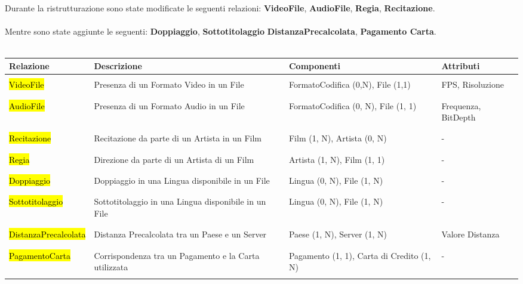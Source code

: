 \documentclass{article}
\begin{document}
\\ 
\\
Durante la ristrutturazione sono state modificate le seguenti relazioni: \textbf{VideoFile}, \textbf{AudioFile}, \textbf{Regia}, \textbf{Recitazione}.
\\ \\ 
Mentre sono state aggiunte le seguenti: \textbf{Doppiaggio}, \textbf{Sottotitolaggio} \textbf{DistanzaPrecalcolata}, \textbf{Pagamento Carta}.
\\ \\
\begin{tabular}{|C{2cm}|C{4.5cm}|C{2.5cm}|C{1.9cm}|}
\hline
 \textbf{Relazione}& \textbf{Descrizione}& \textbf{Componenti}& \textbf{Attributi}\\ 
\hline
\hline
& & & \\
 \hl{VideoFile} & Presenza di un Formato Video in un File & FormatoCodifica (0,N), File (1,1) & FPS, Risoluzione \\ 
& & & \\
\hline
& & & \\
 \hl{AudioFile} & Presenza di un Formato Audio in un File & FormatoCodifica (0, N), File (1, 1) & Frequenza, BitDepth \\ 
& & & \\
\hline
& & & \\
 \hl{Recitazione} & Recitazione da parte di un Artista in un Film & Film (1, N), Artista (0, N) & - \\ 
& & & \\
\hline
& & & \\
 \hl{Regia} & Direzione da parte di un Artista di un Film & Artista (1, N), Film (1, 1) & - \\
& & & \\
\hline
& & & \\
 \hl{Doppiaggio} & Doppiaggio in una Lingua disponibile in un File & Lingua (0, N), File (1, N) & - \\
& & & \\
\hline
& & & \\
 \hl{Sottotitolaggio} & Sottotitolaggio in una Lingua disponibile in un File & Lingua (0, N), File (1, N) & - \\
& & & \\
\hline 
& & & \\
 \hl{DistanzaPrecalcolata} & Distanza Precalcolata tra un Paese e un Server & Paese (1, N), Server (1, N) & Valore Distanza \\
& & & \\
\hline 
& & & \\ 
 \hl{PagamentoCarta} & Corrispondenza tra un Pagamento e la Carta utilizzata & Pagamento (1, 1), Carta di Credito (1, N) & - \\
& & & \\
\hline
\end{tabular}
%
%
%
%
%
%
%
%
\end{document}

